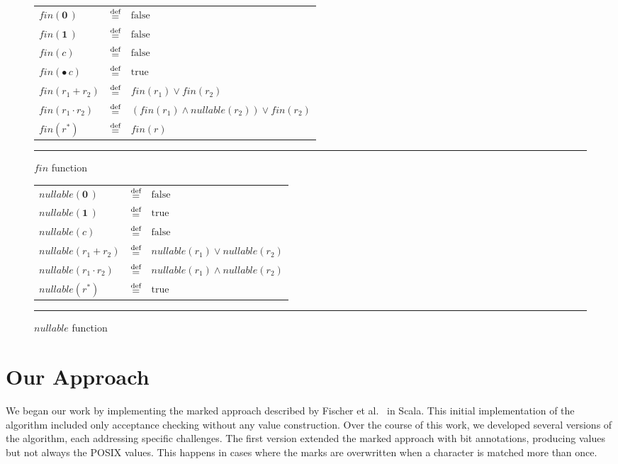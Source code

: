 \documentclass[12pt]{article}
\newcommand{\dn}{\ensuremath{\stackrel{\mbox{\scriptsize def}}{=}}}
\newcommand{\ZERO}{\textbf{0}}
\newcommand{\ONE}{\textbf{1}}
\newcommand{\Marked}[1]{\bullet\,#1}
\newcommand{\fin}{\textit{fin}}
\newcommand{\nullable}{\textit{nullable}}
\begin{document}
\begin{figure}[ht]
  \begin{center}
    \renewcommand{\arraystretch}{1.5}
    \begin{tabular}{lcl}
      $\fin(\ZERO\,)$            & \dn & $\text{false}$ \\
      $\fin(\ONE\,)$             & \dn & $\text{false}$ \\
      $\fin(c)$                  & \dn & $\text{false}$ \\
      $\fin(\Marked{c})$         & \dn & $\text{true}$ \\
      $\fin(r_1 + r_2)$          & \dn & $\fin(r_1) \lor \fin(r_2)$ \\ 
      $\fin(r_1 \cdot r_2)$      & \dn & $(\fin(r_1) \land \nullable(r_2)) \lor \fin(r_2)$ \\
      $\fin(r^*)$                & \dn & $\fin(r)$  
    \end{tabular}
    \renewcommand{\arraystretch}{1.0}

    \mbox{}
    \rule{\linewidth}{0.4pt}
    \caption{$\fin$ function}\label{finFunction}
  \end{center}
\end{figure}

\begin{figure}[ht]
  \begin{center}
    \renewcommand{\arraystretch}{1.5}
    \begin{tabular}{lcl}
      $\nullable(\ZERO\,)$         & \dn & $\text{false}$ \\
      $\nullable(\ONE\,)$          & \dn & $\text{true}$ \\
      $\nullable(c)$               & \dn & $\text{false}$ \\
      $\nullable(r_1 + r_2)$       & \dn & $\nullable(r_1) \lor \nullable(r_2)$ \\ 
      $\nullable(r_1 \cdot r_2)$   & \dn & $\nullable(r_1) \land \nullable(r_2)$ \\
      $\nullable(r^*)$             & \dn & $\text{true}$
    \end{tabular}
    \renewcommand{\arraystretch}{1.0}
    
    \mbox{}
    \rule{\linewidth}{0.4pt}
    \caption{$\nullable$ function}\label{nullableFunction}
  \end{center}
\end{figure}

\FloatBarrier
\section{Our Approach}
We began our work by implementing the marked approach described by Fischer 
et al.~\cite{Fischer2010} in Scala. This initial implementation of the algorithm
included only acceptance checking without any value construction. Over the course
of this work, we developed several versions of the algorithm, each addressing 
specific challenges. The first version extended the marked approach with bit 
annotations, producing values but not always the POSIX values. This happens in 
cases where the marks are overwritten when a character is matched more than once.
\end{document}
